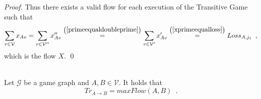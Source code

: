 \documentclass[11pt]{llncs}
\begin{document}
\begin{proof}
       Thus there exists a valid flow for each execution of the Transitive Game such that
       \begin{equation}
          \sum\limits_{v \in \mathcal{V}}x_{Av} = \sum\limits_{v \in \mathcal{V}''}x''_{Av}
          \overset{\left(\ref{primeequaldoubleprime}\right)}{=} \sum\limits_{v \in \mathcal{V}'}x'_{Av}
          \overset{\left(\ref{xprimeequalloss}\right)}{=} Loss_{A, j_1} \enspace,
       \end{equation}
       which is the flow $X$. \qed
    \end{proof}
    \begin{theorem} \ \\
       \label{trustflow}
       Let $\mathcal{G}$ be a game graph and $A, B \in \mathcal{V}$. It holds that
       \begin{equation}
          Tr_{A \rightarrow B} = maxFlow\left(A, B\right) \enspace.
       \end{equation}
    \end{theorem}
\end{document}
